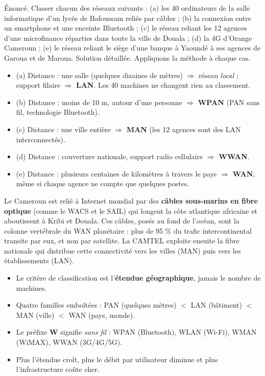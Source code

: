 \documentclass[11pt]{article}
\newcommand{\cle}[1]{{\popxbold\color{popdark}#1}}
\begin{document}
\begin{exoresolu}
Énoncé. Classer chacun des réseaux suivants : (a) les 40 ordinateurs de la salle informatique d'un lycée de Bafoussam reliés par câbles ; (b) la connexion entre un smartphone et une enceinte Bluetooth ; (c) le réseau reliant les 12 agences d'une microfinance réparties dans toute la ville de Douala ; (d) la 4G d'Orange Cameroun ; (e) le réseau reliant le siège d'une banque à Yaoundé à ses agences de Garoua et de Maroua.
\tcblower
Solution détaillée. Appliquons la méthode à chaque cas.
\begin{itemize}
  \item (a) Distance : une salle (quelques dizaines de mètres) $\Rightarrow$ réseau \emph{local} ; support filaire $\Rightarrow$ \textbf{LAN}. Les 40 machines ne changent rien au classement.
  \item (b) Distance : moins de 10 m, autour d'une personne $\Rightarrow$ \textbf{WPAN} (PAN sans fil, technologie Bluetooth).
  \item (c) Distance : une ville entière $\Rightarrow$ \textbf{MAN} (les 12 agences sont des LAN interconnectés).
  \item (d) Distance : couverture nationale, support radio cellulaire $\Rightarrow$ \textbf{WWAN}.
  \item (e) Distance : plusieurs centaines de kilomètres à travers le pays $\Rightarrow$ \textbf{WAN}, même si chaque agence ne compte que quelques postes.
\end{itemize}
\end{exoresolu}

\begin{savaistu}
Le Cameroun est relié à Internet mondial par des \textbf{câbles sous-marins en fibre optique} (comme le WACS et le SAIL) qui longent la côte atlantique africaine et aboutissent à Kribi et Douala. Ces câbles, posés au fond de l'océan, sont la colonne vertébrale du WAN planétaire : plus de 95 \% du trafic intercontinental transite par eux, et non par satellite. La CAMTEL exploite ensuite la fibre nationale qui distribue cette connectivité vers les villes (MAN) puis vers les établissements (LAN).
\end{savaistu}

\begin{aretenir}
\begin{itemize}
  \item Le critère de classification est l'\textbf{étendue géographique}, jamais le nombre de machines.
  \item Quatre familles emboîtées : \cle{PAN} (quelques mètres) $<$ \cle{LAN} (bâtiment) $<$ \cle{MAN} (ville) $<$ \cle{WAN} (pays, monde).
  \item Le préfixe \textbf{W} signifie \emph{sans fil} : WPAN (Bluetooth), WLAN (Wi-Fi), WMAN (WiMAX), WWAN (3G/4G/5G).
  \item Plus l'étendue croît, plus le débit par utilisateur diminue et plus l'infrastructure coûte cher.
\end{itemize}
\end{aretenir}
\end{document}

